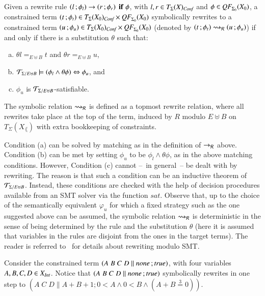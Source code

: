 \begin{definition}
Given a rewrite rule
$\left( l \,; \phi_l \right) \rightarrow \left( r \,; \phi_r \right) \; \mathbf{if}\; \phi$, with $l,r \in
T_\Sigma(X)_{\textit{Conf}}$ and $\phi \in \textit{\textit{QF}}_{\Sigma_{0}}({X_{0}})$,
a constrained term $\left( t \,; \phi_t \right) \in
T_\Sigma(X_{0})_{\textit{Conf}}\times \textit{\textit{QF}}_{\Sigma_{0}}({X_{0}})$
symbolically rewrites to a constrained term $\left( u \,; \phi_u \right)\in
T_\Sigma(X_{0})_{\textit{Conf}}\times \textit{\textit{QF}}_{\Sigma_{0}}({X_{0}})$
(denoted by $\left( t \,; \phi_t \right)\rightsquigarrow_{\mathcal{R}} \left( u \,; \phi_u \right)$) 
if and only if there is a substitution $\theta$  such that:
%
\begin{enumerate}[(a)]
	\item $\theta l =_{E \uplus B} t$ and $\theta r =_{E \uplus B} u$,
	\item $\mathcal{T}_{\Sigma/E \uplus B} \models (\phi_l \land \theta \phi) \Leftrightarrow \phi_u$,
	and
	\item  $\phi_u$ is $\mathcal{T}_{\Sigma/E \uplus  B}$-satisfiable.
\end{enumerate}
\end{definition}

\noindent
The symbolic relation $\rightsquigarrow_{\mathcal{R}}$ is defined as
a topmost rewrite relation,
where all rewrites take place at the top of the term,
 induced by $R$ modulo $E\uplus B$ on
$T_\Sigma(X_\lang)$ with extra bookkeeping of constraints.


Condition (a) can be solved by matching as in the definition of
$\rightarrow_{\mathcal{R}}$ above. Condition (b) can be met by setting $\phi_u$ to
be $\phi_l \land \theta \phi$, as in the above matching
conditions. 
However, Condition (c) cannot --~in general~-- be dealt
with by rewriting. The reason is that such a condition can be an
inductive theorem of $\mathcal{T}_{\Sigma /E \uplus B}$. Instead, these
conditions are checked with the help of decision procedures available
from an SMT solver via the function $\textit{sat}$. Observe that, up
to the choice of the semantically equivalent $\varphi_u$ for which a
fixed strategy such as the one suggested above can be assumed, the
symbolic relation $\rightsquigarrow_{\mathcal{R}}$ is deterministic in the sense of
being determined by the rule and the substitution $\theta$ (here it is
assumed that variables in the rules are disjoint from the ones in the
target terms). The reader is referred to~\cite{rocha-rewsmtjlamp-2017}
for details about rewriting modulo SMT.

\begin{example}
Consider the constrained term $\left( A\;B\;C\;D \parallel \textit{none} \,; \textit{true} \right)$,
with four variables $A,B,C,D \in X_{\textit{Int}}$. 
Notice that $\left( A\;B\;C\;D \parallel
  \textit{none} \,; \textit{true} \right)$ symbolically rewrites in one step to
$(A\;C\;D \parallel A + B + 1 ; 0 < A \land 0 < B \land (A + B
\stackrel{3}{=} 0))$.
\end{example}

